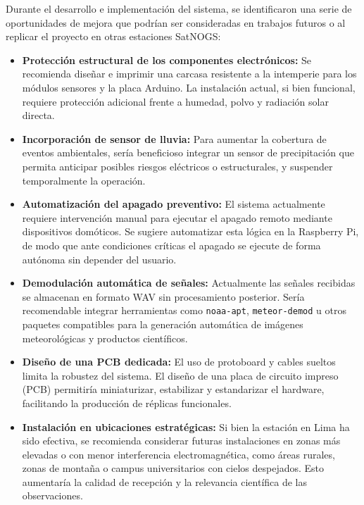 \documentclass[conference]{IEEEtran}
\begin{document}
Durante el desarrollo e implementación del sistema, se identificaron una serie de oportunidades de mejora que podrían ser consideradas en trabajos futuros o al replicar el proyecto en otras estaciones SatNOGS:

\begin{itemize}
  \item \textbf{Protección estructural de los componentes electrónicos:} Se recomienda diseñar e imprimir una carcasa resistente a la intemperie para los módulos sensores y la placa Arduino. La instalación actual, si bien funcional, requiere protección adicional frente a humedad, polvo y radiación solar directa.

  \item \textbf{Incorporación de sensor de lluvia:} Para aumentar la cobertura de eventos ambientales, sería beneficioso integrar un sensor de precipitación que permita anticipar posibles riesgos eléctricos o estructurales, y suspender temporalmente la operación.

  \item \textbf{Automatización del apagado preventivo:} El sistema actualmente requiere intervención manual para ejecutar el apagado remoto mediante dispositivos domóticos. Se sugiere automatizar esta lógica en la Raspberry Pi, de modo que ante condiciones críticas el apagado se ejecute de forma autónoma sin depender del usuario.

  \item \textbf{Demodulación automática de señales:} Actualmente las señales recibidas se almacenan en formato WAV sin procesamiento posterior. Sería recomendable integrar herramientas como \texttt{noaa-apt}, \texttt{meteor-demod} u otros paquetes compatibles para la generación automática de imágenes meteorológicas y productos científicos.

  \item \textbf{Diseño de una PCB dedicada:} El uso de protoboard y cables sueltos limita la robustez del sistema. El diseño de una placa de circuito impreso (PCB) permitiría miniaturizar, estabilizar y estandarizar el hardware, facilitando la producción de réplicas funcionales.

  \item \textbf{Instalación en ubicaciones estratégicas:} Si bien la estación en Lima ha sido efectiva, se recomienda considerar futuras instalaciones en zonas más elevadas o con menor interferencia electromagnética, como áreas rurales, zonas de montaña o campus universitarios con cielos despejados. Esto aumentaría la calidad de recepción y la relevancia científica de las observaciones.
\end{itemize}
\end{document}

